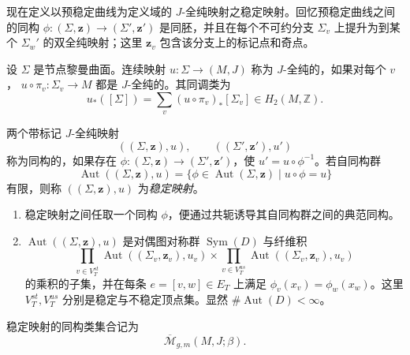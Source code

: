 现在定义以预稳定曲线为定义域的 $J$-全纯映射之稳定映射。回忆预稳定曲线之间的同构
$\phi:(\Sigma,\boldsymbol z)\to(\Sigma',\boldsymbol z')$ 是同胚，并且在每个不可约分支
$\Sigma_v$ 上提升为到某个 $\Sigma_w'$ 的双全纯映射；这里 $\boldsymbol z_v$ 包含该分支上的标记点和奇点。

\begin{definition}\label{def:holomorphic-map-nodal-riemann-surface}
设 $\Sigma$ 是节点黎曼曲面。连续映射
$u:\Sigma\to(M,J)$ 称为 $J$-全纯的，如果对每个 $v$，
$u\circ\pi_v:\Sigma_v\to M$ 都是 $J$-全纯的。其同调类为
\[
 u_*([\Sigma])=\sum_v(u\circ\pi_v)_*[\Sigma_v]
 \in H_2(M,\mathbb Z).
\]
\end{definition}

\begin{definition}\label{def:isomorphism-stable-map}
两个带标记 $J$-全纯映射
\[
 ((\Sigma,\boldsymbol z),u),\qquad ((\Sigma',\boldsymbol z'),u')
\]
称为同构的，如果存在
$\phi:(\Sigma,\boldsymbol z)\to(\Sigma',\boldsymbol z')$，使
$u'=u\circ\phi^{-1}$。若自同构群
\[
 \operatorname{Aut}((\Sigma,\boldsymbol z),u)
 =\{\phi\in\operatorname{Aut}(\Sigma,\boldsymbol z)\mid u\circ\phi=u\}
\]
有限，则称 $((\Sigma,\boldsymbol z),u)$ 为\emph{稳定映射}。
\end{definition}

\begin{remark}\label{rem:automorphisms-stable-maps}
\begin{enumerate}[label=(\arabic*)]
 \item 稳定映射之间任取一个同构 $\phi$，便通过共轭诱导其自同构群之间的典范同构。
 \item $\operatorname{Aut}((\Sigma,\boldsymbol z),u)$ 是对偶图对称群
 $\operatorname{Sym}(D)$ 与纤维积
 \[
  \prod_{v\in V_T^{st}}\operatorname{Aut}((\Sigma_v,\boldsymbol z_v),u_v)
  \times
  \prod_{v\in V_T^{us}}\operatorname{Aut}((\Sigma_v,\boldsymbol z_v),u_v)
 \]
 的乘积的子集，并在每条 $e=[v,w]\in E_T$ 上满足
 $\phi_v(x_v)=\phi_w(x_w)$。这里 $V_T^{st},V_T^{us}$ 分别是稳定与不稳定顶点集。显然 $\#\operatorname{Aut}(D)<\infty$。
\end{enumerate}
\end{remark}

\begin{definition}\label{def:moduli-space-stable-maps}
稳定映射的同构类集合记为
\[
 \overline{\mathcal M}_{g,m}(M,J;\beta).
\]
\end{definition}

